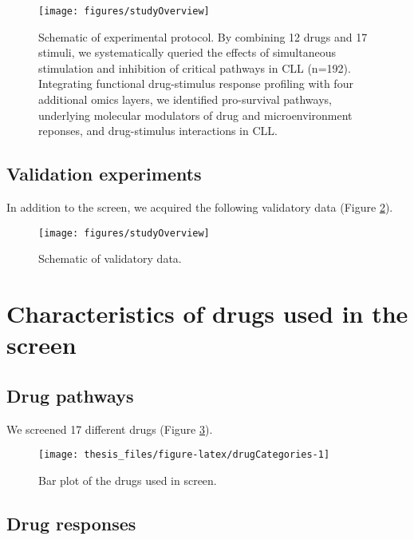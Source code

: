 \documentclass[11pt, a4paper, twosided]{book}
\begin{document}
\begin{figure}

{\centering \texttt{[image: figures/studyOverview]} 

}

\caption{Schematic of experimental protocol. By combining 12 drugs and 17 stimuli, we systematically queried the effects of simultaneous stimulation and inhibition of critical pathways in CLL (n=192). Integrating functional drug-stimulus response profiling with four additional omics layers, we identified pro-survival pathways, underlying molecular modulators of drug and microenvironment reponses, and drug-stimulus interactions in CLL.}\label{fig:studyOverview}
\end{figure}
\hypertarget{validation-experiments}{%
\subsection{Validation experiments}\label{validation-experiments}}

In addition to the screen, we acquired the following validatory data (Figure \ref{fig:additionalData}).


\begin{figure}

{\centering \texttt{[image: figures/studyOverview]} 

}

\caption{Schematic of validatory data.}\label{fig:additionalData}
\end{figure}
\hypertarget{characteristics-of-drugs-used-in-the-screen}{%
\section{Characteristics of drugs used in the screen}\label{characteristics-of-drugs-used-in-the-screen}}

\hypertarget{drug-pathways}{%
\subsection{Drug pathways}\label{drug-pathways}}

We screened 17 different drugs (Figure \ref{fig:drugCategories}).


\begin{figure}

{\centering \texttt{[image: thesis\_files/figure-latex/drugCategories-1]} 

}

\caption{Bar plot of the drugs used in screen.}\label{fig:drugCategories}
\end{figure}
\hypertarget{drug-responses}{%
\subsection{Drug responses}\label{drug-responses}}
\end{document}
